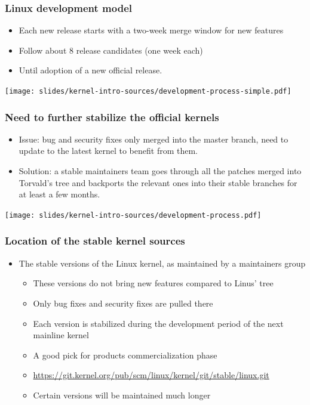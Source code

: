 \begin{frame}
  \frametitle{Linux development model}
  \begin{itemize}
  \item Each new release starts with a two-week merge window for new
    features
  \item Follow about 8 release candidates (one week each)
  \item Until adoption of a new official release.
  \end{itemize}
  \begin{center}
    \texttt{[image: slides/kernel-intro-sources/development-process-simple.pdf]}
  \end{center}
\end{frame}

\begin{frame}[fragile]
  \frametitle{Need to further stabilize the official kernels}
  \begin{itemize}
  \item Issue: bug and security fixes only merged into the master
    branch, need to update to the latest kernel to benefit from them.
  \item Solution: a stable maintainers team goes through all the patches
    merged into Torvald's tree and backports the relevant ones into
    their stable branches for at least a few months.
  \end{itemize}
  \begin{center}
    \texttt{[image: slides/kernel-intro-sources/development-process.pdf]}
  \end{center}
\end{frame}

\begin{frame}
  \frametitle{Location of the stable kernel sources}
  \begin{itemize}
    \item The stable versions of the Linux kernel, as maintained by a
      maintainers group
    \begin{itemize}
    \item These versions do not bring new features compared to Linus'
      tree
    \item Only bug fixes and security fixes are pulled there
    \item Each version is stabilized during the development period of
      the next mainline kernel
    \item A good pick for products commercialization phase
    \item \url{https://git.kernel.org/pub/scm/linux/kernel/git/stable/linux.git}
    \item Certain versions will be maintained much longer
    \end{itemize}
  \end{itemize}
\end{frame}

